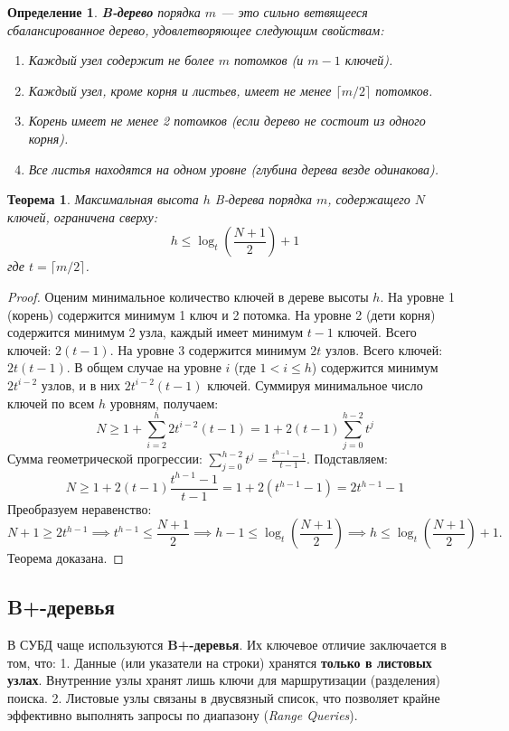 \documentclass[12pt, a4paper]{article}
\newtheorem{theorem}{Теорема}
\newtheorem{definition}{Определение}
\begin{document}
\begin{definition}
\textbf{B-дерево} порядка $m$ --- это сильно ветвящееся сбалансированное дерево, удовлетворяющее следующим свойствам:
\begin{enumerate}
    \item Каждый узел содержит не более $m$ потомков (и $m-1$ ключей).
    \item Каждый узел, кроме корня и листьев, имеет не менее $\lceil m/2 \rceil$ потомков.
    \item Корень имеет не менее 2 потомков (если дерево не состоит из одного корня).
    \item Все листья находятся на одном уровне (глубина дерева везде одинакова).
\end{enumerate}
\end{definition}

\begin{theorem}
Максимальная высота $h$ B-дерева порядка $m$, содержащего $N$ ключей, ограничена сверху:
\[
h \le \log_t \left( \frac{N+1}{2} \right) + 1
\]
где $t = \lceil m/2 \rceil$.
\end{theorem}

\begin{proof}
Оценим минимальное количество ключей в дереве высоты $h$.
На уровне 1 (корень) содержится минимум 1 ключ и 2 потомка.
На уровне 2 (дети корня) содержится минимум 2 узла, каждый имеет минимум $t-1$ ключей. Всего ключей: $2(t-1)$.
На уровне 3 содержится минимум $2t$ узлов. Всего ключей: $2t(t-1)$.
В общем случае на уровне $i$ (где $1 < i \le h$) содержится минимум $2t^{i-2}$ узлов, и в них $2t^{i-2}(t-1)$ ключей.
Суммируя минимальное число ключей по всем $h$ уровням, получаем:
\[
N \ge 1 + \sum_{i=2}^{h} 2t^{i-2}(t-1) = 1 + 2(t-1) \sum_{j=0}^{h-2} t^j
\]
Сумма геометрической прогрессии: $\sum_{j=0}^{h-2} t^j = \frac{t^{h-1}-1}{t-1}$. Подставляем:
\[
N \ge 1 + 2(t-1) \frac{t^{h-1}-1}{t-1} = 1 + 2(t^{h-1}-1) = 2t^{h-1} - 1
\]
Преобразуем неравенство:
\[
N + 1 \ge 2t^{h-1} \implies t^{h-1} \le \frac{N+1}{2} \implies h - 1 \le \log_t\left(\frac{N+1}{2}\right) \implies h \le \log_t\left(\frac{N+1}{2}\right) + 1.
\]
Теорема доказана.
\end{proof}

\subsection{B+-деревья}
В СУБД чаще используются \textbf{B+-деревья}. Их ключевое отличие заключается в том, что:
1. Данные (или указатели на строки) хранятся \textbf{только в листовых узлах}. Внутренние узлы хранят лишь ключи для маршрутизации (разделения) поиска.
2. Листовые узлы связаны в двусвязный список, что позволяет крайне эффективно выполнять запросы по диапазону (\textit{Range Queries}).
\end{document}
